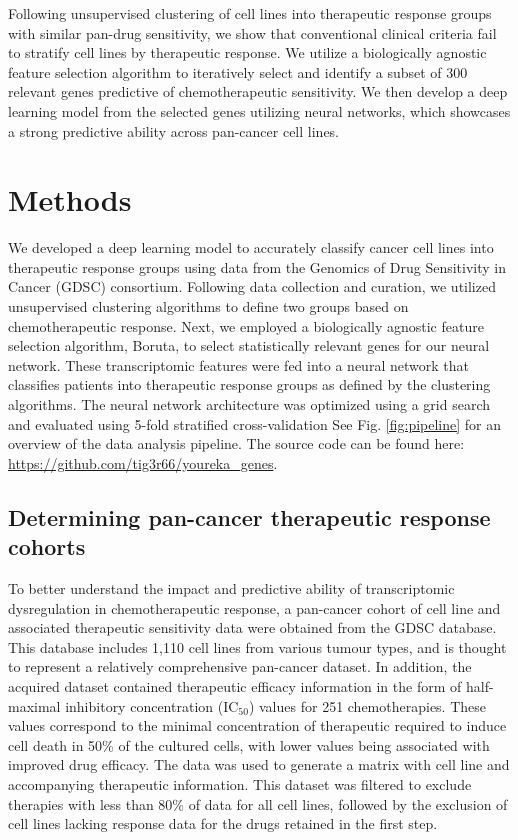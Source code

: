 \documentclass[10pt, letterpaper, twocolumn]{article}
\begin{document}
Following unsupervised clustering of cell lines into therapeutic response groups with similar pan-drug sensitivity, we show that conventional clinical criteria fail to stratify cell lines by therapeutic response. We utilize a biologically agnostic feature selection algorithm to iteratively select and identify a subset of 300 relevant genes predictive of chemotherapeutic sensitivity. We then develop a deep learning model from the selected genes utilizing neural networks, which showcases a strong predictive ability across pan-cancer cell lines.


\section{Methods}
We developed a deep learning model to accurately classify cancer cell lines into therapeutic response groups using data from the Genomics of Drug Sensitivity in Cancer (GDSC) consortium. Following data collection and curation, we utilized unsupervised clustering algorithms to define two groups based on chemotherapeutic response. Next, we employed a biologically agnostic feature selection algorithm, Boruta, to select statistically relevant genes for our neural network. These transcriptomic features were fed into a neural network that classifies patients into therapeutic response groups as defined by the clustering algorithms. The neural network architecture was optimized using a grid search and evaluated using 5-fold stratified cross-validation See Fig. \ref{fig:pipeline} for an overview of the data analysis pipeline. The source code can be found here: \url{https://github.com/tig3r66/youreka_genes}.


\subsection{Determining pan-cancer therapeutic response cohorts}
To better understand the impact and predictive ability of transcriptomic dysregulation in chemotherapeutic response, a pan-cancer cohort of cell line and associated therapeutic sensitivity data were obtained from the GDSC database. This database includes 1,110 cell lines from various tumour types, and is thought to represent a relatively comprehensive pan-cancer dataset. In addition, the acquired dataset contained therapeutic efficacy information in the form of half-maximal inhibitory concentration (IC$_{50}$) values for 251 chemotherapies. These values correspond to the minimal concentration of therapeutic required to induce cell death in 50\% of the cultured cells, with lower values being associated with improved drug efficacy. The data was used to generate a matrix with cell line and accompanying therapeutic information. This dataset was filtered to exclude therapies with less than 80\% of data for all cell lines, followed by the exclusion of cell lines lacking response data for the drugs retained in the first step.
\end{document}
